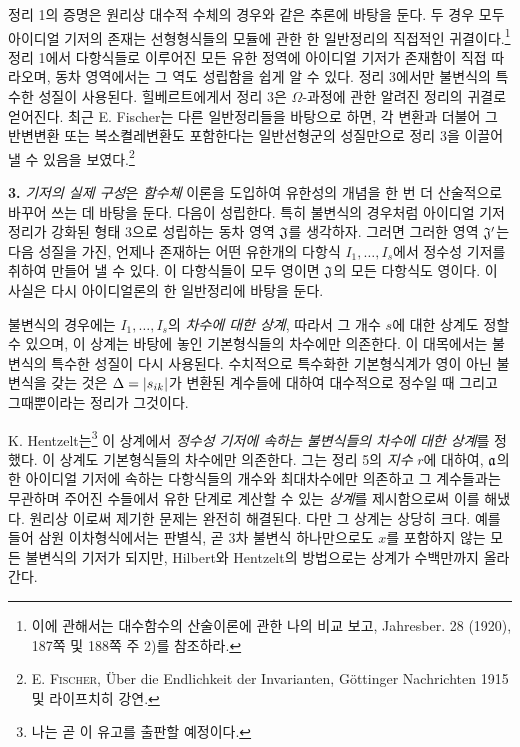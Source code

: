 정리 1의 증명은 원리상 대수적 수체의 경우와 같은 추론에 바탕을 둔다. 두 경우 모두 아이디얼 기저의 존재는 선형형식들의 모듈에 관한 한 일반정리의 직접적인 귀결이다.\footnote{이에 관해서는 대수함수의 산술이론에 관한 나의 비교 보고, Jahresber. 28 (1920), 187쪽 및 188쪽 주 2)를 참조하라.} 정리 1에서 다항식들로 이루어진 모든 유한 정역에 아이디얼 기저가 존재함이 직접 따라오며, 동차 영역에서는 그 역도 성립함을 쉽게 알 수 있다. 정리 3에서만 불변식의 특수한 성질이 사용된다. 힐베르트에게서 정리 3은 $\Omega$-과정에 관한 알려진 정리의 귀결로 얻어진다. 최근 E. Fischer는 다른 일반정리들을 바탕으로 하면, 각 변환과 더불어 그 반변변환 또는 복소켤레변환도 포함한다는 일반선형군의 성질만으로 정리 3을 이끌어 낼 수 있음을 보였다.\footnote{E. \textsc{Fischer}, Über die Endlichkeit der Invarianten, Göttinger Nachrichten 1915 및 라이프치히 강연.}

\textbf{3.} \emph{기저의 실제 구성}은 \emph{함수체} 이론을 도입하여 유한성의 개념을 한 번 더 산술적으로 바꾸어 쓰는 데 바탕을 둔다. 다음이 성립한다.
특히 불변식의 경우처럼 아이디얼 기저 정리가 강화된 형태 3으로 성립하는 동차 영역 $\mathfrak J$를 생각하자. 그러면 그러한 영역 $\mathfrak J'$는 다음 성질을 가진, 언제나 존재하는 어떤 유한개의 다항식 $I_1,\ldots,I_s$에서 정수성 기저를 취하여 만들어 낼 수 있다. 이 다항식들이 모두 영이면 $\mathfrak J$의 모든 다항식도 영이다. 이 사실은 다시 아이디얼론의 한 일반정리에 바탕을 둔다.

불변식의 경우에는 $I_1,\ldots,I_s$의 \emph{차수에 대한 상계}, 따라서 그 개수 $s$에 대한 상계도 정할 수 있으며, 이 상계는 바탕에 놓인 기본형식들의 차수에만 의존한다. 이 대목에서는 불변식의 특수한 성질이 다시 사용된다. 수치적으로 특수화한 기본형식계가 영이 아닌 불변식을 갖는 것은 $\Delta=|s_{ik}|$가 변환된 계수들에 대하여 대수적으로 정수일 때 그리고 그때뿐이라는 정리가 그것이다.

K. Hentzelt는\footnote{나는 곧 이 유고를 출판할 예정이다.} 이 상계에서 \emph{정수성 기저에 속하는 불변식들의 차수에 대한 상계}를 정했다. 이 상계도 기본형식들의 차수에만 의존한다. 그는 정리 5의 \emph{지수} $r$에 대하여, $\mathfrak{a}$의 한 아이디얼 기저에 속하는 다항식들의 개수와 최대차수에만 의존하고 그 계수들과는 무관하며 주어진 수들에서 유한 단계로 계산할 수 있는 \emph{상계}를 제시함으로써 이를 해냈다. 원리상 이로써 제기한 문제는 완전히 해결된다. 다만 그 상계는 상당히 크다. 예를 들어 삼원 이차형식에서는 판별식, 곧 3차 불변식 하나만으로도 $x$를 포함하지 않는 모든 불변식의 기저가 되지만, Hilbert와 Hentzelt의 방법으로는 상계가 수백만까지 올라간다.

